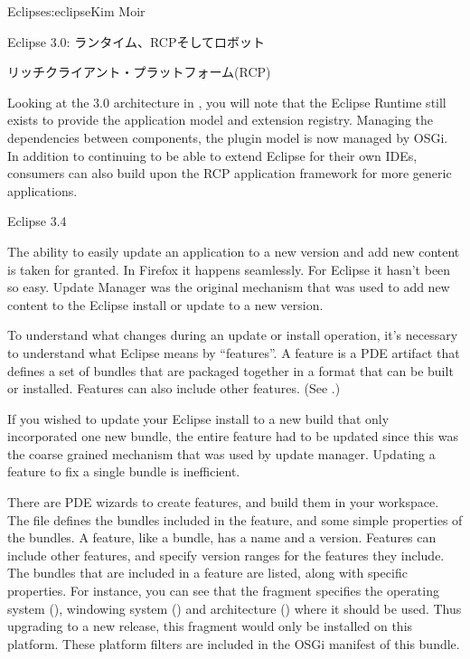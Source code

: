 \begin{aosachapter}{Eclipse}{s:eclipse}{Kim Moir}
\begin{aosasect1}{Eclipse 3.0: ランタイム、RCPそしてロボット}
\begin{aosasect2}{リッチクライアント・プラットフォーム(RCP)}

Looking at the 3.0 architecture in , you will
note that the Eclipse Runtime still exists to provide the application
model and extension registry.  Managing the dependencies between
components, the plugin model is now managed by OSGi. In addition
to continuing to be able to extend Eclipse for their own IDEs,
consumers can also build upon the RCP application framework for more
generic applications.

\end{aosasect2}

\end{aosasect1}

\begin{aosasect1}{Eclipse 3.4}

The ability to easily update an application to a new version and add
new content is taken for granted. In Firefox it happens seamlessly.
For Eclipse it hasn't been so easy. Update Manager was the original
mechanism that was used to add new content to the Eclipse install or
update to a new version.

To understand what changes during an update or install operation,
it's necessary to understand what Eclipse means by ``features''.
A feature is a PDE artifact that defines a set
of bundles that are packaged together in a format that can be built or
installed. Features can also include other features. (See
.)


If you wished to update your Eclipse install to a new build that only
incorporated one new bundle, the entire feature had to be updated
since this was the coarse grained mechanism that was used by update
manager.  Updating a feature to fix a single bundle is inefficient.

There are PDE wizards to create features, and build them in your
workspace.  The  file defines the bundles included
in the feature, and some simple properties of the bundles. A feature,
like a bundle, has a name and a version. Features can include other
features, and specify version ranges for the features they
include. The bundles that are included in a feature are listed, along
with specific properties. For instance, you can see that the
 fragment specifies the operating
system (), windowing system () and architecture
() where it should be used. Thus upgrading to a new
release, this fragment would only be installed on this platform. These
platform filters are included in the OSGi manifest of this bundle.


\end{aosasect1}
\end{aosachapter}
